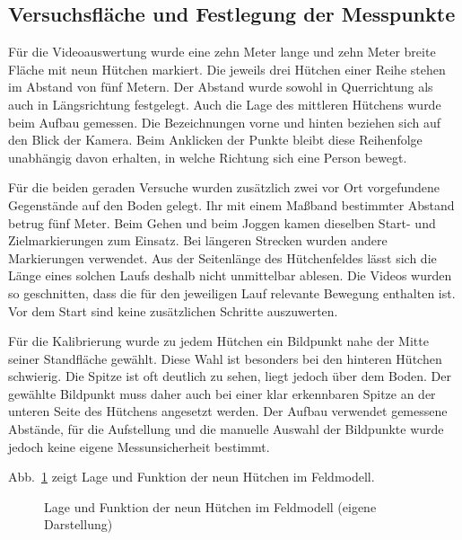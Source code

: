 \subsection{Versuchsfläche und Festlegung der Messpunkte}
Für die Videoauswertung wurde eine zehn Meter lange und zehn Meter breite Fläche mit neun Hütchen markiert. Die jeweils drei Hütchen einer Reihe stehen im Abstand von fünf Metern. Der Abstand wurde sowohl in Querrichtung als auch in Längsrichtung festgelegt. Auch die Lage des mittleren Hütchens wurde beim Aufbau gemessen. Die Bezeichnungen vorne und hinten beziehen sich auf den Blick der Kamera. Beim Anklicken der Punkte bleibt diese Reihenfolge unabhängig davon erhalten, in welche Richtung sich eine Person bewegt.

Für die beiden geraden Versuche wurden zusätzlich zwei vor Ort vorgefundene Gegenstände auf den Boden gelegt. Ihr mit einem Maßband bestimmter Abstand betrug fünf Meter. Beim Gehen und beim Joggen kamen dieselben Start- und Zielmarkierungen zum Einsatz. Bei längeren Strecken wurden andere Markierungen verwendet. Aus der Seitenlänge des Hütchenfeldes lässt sich die Länge eines solchen Laufs deshalb nicht unmittelbar ablesen. Die Videos wurden so geschnitten, dass die für den jeweiligen Lauf relevante Bewegung enthalten ist. Vor dem Start sind keine zusätzlichen Schritte auszuwerten.

Für die Kalibrierung wurde zu jedem Hütchen ein Bildpunkt nahe der Mitte seiner Standfläche gewählt. Diese Wahl ist besonders bei den hinteren Hütchen schwierig. Die Spitze ist oft deutlich zu sehen, liegt jedoch über dem Boden. Der gewählte Bildpunkt muss daher auch bei einer klar erkennbaren Spitze an der unteren Seite des Hütchens angesetzt werden. Der Aufbau verwendet gemessene Abstände, für die Aufstellung und die manuelle Auswahl der Bildpunkte wurde jedoch keine eigene Messunsicherheit bestimmt.

Abb.~\ref{abb:em-feld} zeigt Lage und Funktion der neun Hütchen im Feldmodell.
\begin{figure}[htbp]\centering
{}
\caption{Lage und Funktion der neun Hütchen im Feldmodell (eigene Darstellung)}\label{abb:em-feld}\end{figure}


